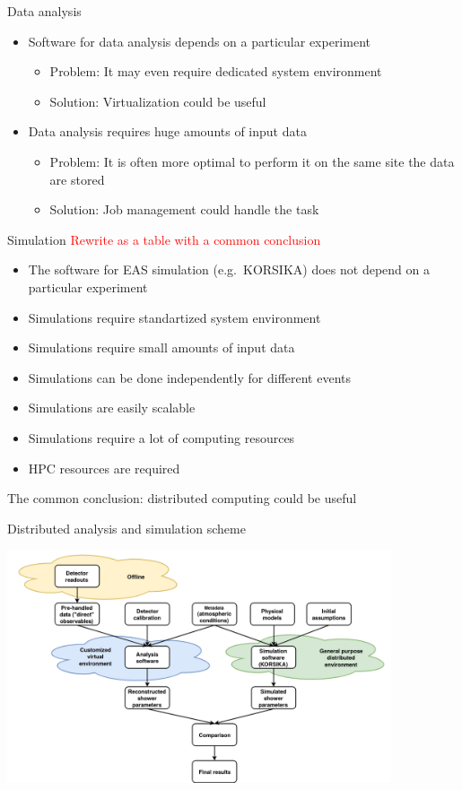 \documentclass[18pt]{beamer}
\newcommand{\itemarrow}{\scriptsize\raise1.25pt\hbox{\textcolor{kit-green100}{$\blacktriangleright$}}}
\newcommand{\concl}[1]{\item[\itemarrow]\textcolor{kit-green100}{#1}}
\begin{document}
\begin{frame}{Data analysis}
\begin{itemize}
  \item Software for data analysis depends on a particular experiment
  \begin{itemize}
    \item Problem: It may even require dedicated system environment
    \concl{Solution: Virtualization could be useful}
  \end{itemize}
  \item Data analysis requires huge amounts of input data
  \begin{itemize}
    \item Problem: It is often more optimal to perform it on the same site the data are stored
    \concl{Solution: Job management could handle the task}
  \end{itemize}
\end{itemize}
\end{frame}

\begin{frame}{Simulation}
\textcolor{red}{Rewrite as a table with a common conclusion}
\begin{itemize}
  \item The software for EAS simulation (e.g.\ KORSIKA) does not depend on a particular experiment
  \concl{Simulations require standartized system environment}
  \item Simulations require small amounts of input data
  \item Simulations can be done independently for different events
  \concl{Simulations are easily scalable}
  \item Simulations require a lot of computing resources
  \concl{HPC resources are required}
\end{itemize}
The common conclusion: distributed computing could be useful
\end{frame}

\begin{frame}{Distributed analysis and simulation scheme}
\begin{center}
\includegraphics[width=0.85\textwidth]{pics/KCDC_workflow_f1.png}
\end{center}
\end{frame}
\end{document}
